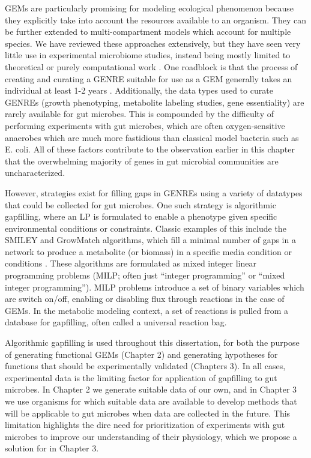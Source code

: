 \documentclass[11pt,twocolumn,notitlepage,openany,twoside]{book}
\begin{document}
\begin{refsection}
GEMs are particularly promising for modeling ecological phenomenon because they explicitly take into account the resources available to an organism. They can be further extended to multi-compartment models which account for multiple species. We have reviewed these approaches extensively, but they have seen very little use in experimental microbiome studies, instead being mostly limited to theoretical or purely computational work \cite{Biggs2015-lz}. One roadblock is that the process of creating and curating a GENRE suitable for use as a GEM generally takes an individual at least 1-2 years \cite{Thiele2010-yq}. Additionally, the data types used to curate GENREs (growth phenotyping, metabolite labeling studies, gene essentiality) are rarely available for gut microbes. This is compounded by the difficulty of performing experiments with gut microbes, which are often oxygen-sensitive anaerobes which are much more fastidious than classical model bacteria such as E. coli. All of these factors contribute to the observation earlier in this chapter that the overwhelming majority of genes in gut microbial communities are uncharacterized.

However, strategies exist for filling gaps in GENREs using a variety of datatypes that could be collected for gut microbes. One such strategy is algorithmic gapfilling, where an LP is formulated to enable a phenotype given specific environmental conditions or constraints. Classic examples of this include the SMILEY and GrowMatch algorithms, which fill a minimal number of gaps in a network to produce a metabolite (or biomass) in a specific media condition or conditions \cite{Kumar2009-js, Reed2006-qv}. These algorithms are formulated as mixed integer linear programming problems (MILP; often just “integer programming” or “mixed integer programming”). MILP problems introduce a set of binary variables which are switch on/off, enabling or disabling flux through reactions in the case of GEMs. In the metabolic modeling context, a set of reactions is pulled from a database for gapfilling, often called a universal reaction bag.

Algorithmic gapfilling is used throughout this dissertation, for both the purpose of generating functional GEMs (Chapter 2) and generating hypotheses for functions that should be experimentally validated (Chapters 3). In all cases, experimental data is the limiting factor for application of gapfilling to gut microbes. In Chapter 2 we generate suitable data of our own, and in Chapter 3 we use organisms for which suitable data are available to develop methods that will be applicable to gut microbes when data are collected in the future. This limitation highlights the dire need for prioritization of experiments with gut microbes to improve our understanding of their physiology, which we propose a solution for in Chapter 3.


\end{refsection}
\end{document}
